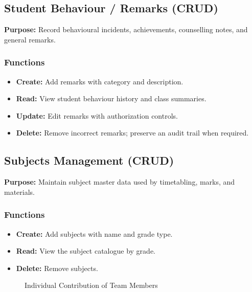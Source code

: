 \documentclass[12pt, a4paper]{report}
\begin{document}
\subsection{Student Behaviour / Remarks (CRUD)}
\textbf{Purpose:} Record behavioural incidents, achievements, counselling notes, and general remarks.

\subsubsection*{Functions}
\begin{itemize}[leftmargin=*]
  \item \textbf{Create:} Add remarks with category and description.
  \item \textbf{Read:} View student behaviour history and class summaries.
  \item \textbf{Update:} Edit remarks with authorization controls.
  \item \textbf{Delete:} Remove incorrect remarks; preserve an audit trail when required.
\end{itemize}

\subsection{Subjects Management (CRUD)}
\textbf{Purpose:} Maintain subject master data used by timetabling, marks, and materials.

\subsubsection*{Functions}
\begin{itemize}[leftmargin=*]
  \item \textbf{Create:} Add subjects with name and grade type.
  \item \textbf{Read:} View the subject catalogue by grade.
  \item \textbf{Delete:} Remove subjects.
\end{itemize}

\begin{figure}[H]
    \centering
    \caption{Individual Contribution of Team Members}
    \label{fig:contribution-pie}
\end{figure}
\end{document}
